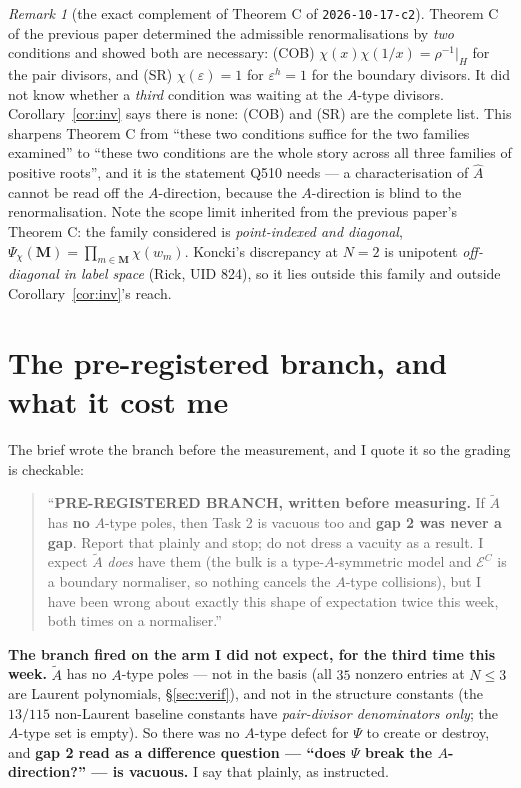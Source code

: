 \documentclass[11pt]{article}
\theoremstyle{plain}
\theoremstyle{definition}
\theoremstyle{remark}
\newtheorem{rem}[thm]{Remark}
\theoremstyle{plain}
\newcommand{\bM}{\mathbf{M}}
\newcommand{\At}{\widetilde{A}}
\newcommand{\Ah}{\widehat{A}}
\begin{document}
\begin{rem}[the exact complement of Theorem C of \texttt{2026-10-17-c2}]
Theorem C of the previous paper determined the admissible renormalisations by
\emph{two} conditions and showed both are necessary: (COB)
$\chi(x)\chi(1/x)=\rho^{-1}|_H$ for the pair divisors, and (SR)
$\chi(\varepsilon)=1$ for $\varepsilon^h=1$ for the boundary divisors.  It did
not know whether a \emph{third} condition was waiting at the $A$-type divisors.
Corollary~\ref{cor:inv} says there is none: (COB) and (SR) are the complete list.
This sharpens Theorem C from ``these two conditions suffice for the two families
examined'' to ``these two conditions are the whole story across all three
families of positive roots'', and it is the statement Q510 needs --- a
characterisation of $\Ah$ cannot be read off the $A$-direction, because the
$A$-direction is blind to the renormalisation.  Note the scope limit inherited
from the previous paper's Theorem C: the family considered is
\emph{point-indexed and diagonal}, $\Psi_\chi(\bM)=\prod_{m\in\bM}\chi(w_m)$.
Koncki's discrepancy at $N=2$ is unipotent \emph{off-diagonal in label space}
(Rick, UID 824), so it lies outside this family and outside
Corollary~\ref{cor:inv}'s reach.
\end{rem}

\section{The pre-registered branch, and what it cost me}
\label{sec:branch}

The brief wrote the branch before the measurement, and I quote it so the grading
is checkable:

\begin{quote}\small
``\textbf{PRE-REGISTERED BRANCH, written before measuring.} If $\At$ has
\textbf{no} $A$-type poles, then Task 2 is vacuous too and \textbf{gap 2 was
never a gap}.  Report that plainly and stop; do not dress a vacuity as a result.
I expect $\At$ \emph{does} have them (the bulk is a type-$A$-symmetric model and
$\mathcal{E}^C$ is a boundary normaliser, so nothing cancels the $A$-type
collisions), but I have been wrong about exactly this shape of expectation twice
this week, both times on a normaliser.''
\end{quote}

\textbf{The branch fired on the arm I did not expect, for the third time this
week.}  $\At$ has no $A$-type poles --- not in the basis (all $35$ nonzero
entries at $N\le3$ are Laurent polynomials, \S\ref{sec:verif}), and not in the
structure constants (the $13/115$ non-Laurent baseline constants have
\emph{pair-divisor denominators only}; the $A$-type set is empty).  So there was
no $A$-type defect for $\Psi$ to create or destroy, and \textbf{gap 2 read as a
difference question --- ``does $\Psi$ break the $A$-direction?'' --- is
vacuous.}  I say that plainly, as instructed.
\end{document}
